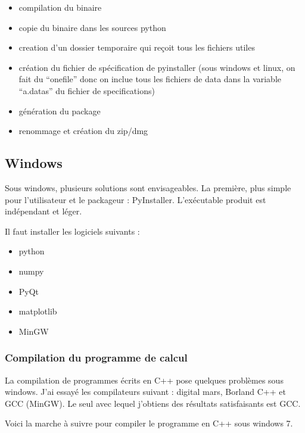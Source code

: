 \documentclass[12pt,a4paper]{article}
\begin{document}
        \begin{itemize}
            \item compilation du binaire
            \item copie du binaire dans les sources python
            \item creation d'un dossier temporaire qui reçoit tous les fichiers
                utiles
            \item création du fichier de spécification de pyinstaller (sous
                windows et linux, on fait du ``onefile'' donc on inclue tous les
                fichiers de data dans la variable ``a.datas'' du fichier de
                specifications)
            \item génération du package
            \item renommage et création du zip/dmg
        \end{itemize}

    
    \subsection{Windows}
        Sous windows, plusieurs solutions sont envisageables. La première, plus
        simple pour l'utilisateur et le packageur : PyInstaller. L'ex\'ecutable
        produit est ind\'ependant et l\'eger. \newline

        Il faut installer les logiciels suivants :
        \begin{itemize}
            \item python
            \item numpy
            \item PyQt
            \item matplotlib
            \item MinGW
        \end{itemize}

        \subsubsection{Compilation du programme de calcul}
        La compilation de programmes écrits en C++ pose quelques problèmes sous
        windows. J'ai essayé les compilateurs suivant : 
        digital mars, Borland C++ et GCC (MinGW). Le seul avec lequel j'obtiens
        des résultats satisfaisants est GCC. 

        Voici la marche à suivre pour compiler le programme en C++ sous windows 7.\\
\end{document}
